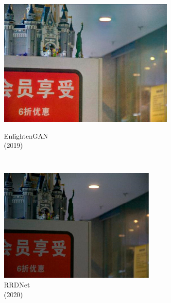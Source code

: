 \documentclass[CJK,aspectratio=169]{beamer}  %
\begin{document}
\begin{frame}
\begin{figure}
\begin{minipage}{.65\columnwidth}
				\begin{minipage}{0.17\columnwidth}
					\includegraphics[width=\linewidth]{picture/LLIE/VE-LOL-L/EnlightenGAN}
					\caption*{\tiny EnlightenGAN \\ (2019)}
					\label{fig: EnlightenGAN}	
				\end{minipage}\\
				\vspace{-0.3cm}
				\begin{minipage}{0.17\columnwidth}
					\includegraphics[width=\linewidth]{picture/LLIE/VE-LOL-L/RRDNet}
					\caption*{\tiny RRDNet \\ (2020)}
					\label{fig: RRDNet}	
				\end{minipage}
				\begin{minipage}{0.17\columnwidth}

\end{minipage}
\end{minipage}
\end{figure}
\end{frame}
\end{document}

